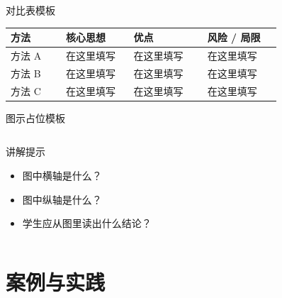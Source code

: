 \documentclass[aspectratio=169,professionalfonts]{beamer}
\begin{document}
\begin{frame}{对比表模板}
    \small
    \begin{table}
        \centering
        \begin{tabular}{>{\raggedright\arraybackslash}p{0.18\linewidth} >{\raggedright\arraybackslash}p{0.22\linewidth} >{\raggedright\arraybackslash}p{0.24\linewidth} >{\raggedright\arraybackslash}p{0.24\linewidth}}
            \toprule
            方法 & 核心思想 & 优点 & 风险 / 局限 \\
            \midrule
            方法 A & 在这里填写 & 在这里填写 & 在这里填写 \\
            方法 B & 在这里填写 & 在这里填写 & 在这里填写 \\
            方法 C & 在这里填写 & 在这里填写 & 在这里填写 \\
            \bottomrule
        \end{tabular}
    \end{table}
\end{frame}

\begin{frame}{图示占位模板}
    \begin{columns}[c,onlytextwidth]

        \begin{block}{讲解提示}
            \begin{itemize}
                \item 图中横轴是什么？
                \item 图中纵轴是什么？
                \item 学生应从图里读出什么结论？
            \end{itemize}
        \end{block}
    \end{columns}
\end{frame}

\section{案例与实践}
\end{document}
